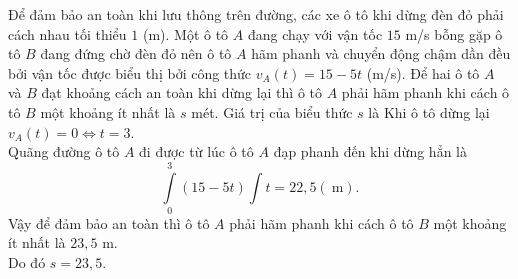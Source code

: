 \begin{bt}%
	Để đảm bảo an toàn khi lưu thông trên đường, các xe ô tô khi dừng đèn đỏ phải cách nhau tối thiểu $1$ (m). Một ô tô $A$ đang chạy với vận tốc $15$ m/s bỗng gặp ô tô $B$ đang đứng chờ đèn đỏ nên ô tô $A$ hãm phanh và chuyển động chậm dần đều bởi vận tốc được biểu thị bởi công thức $v_A(t)=15-5 t$ (m/s). Để hai ô tô $A$ và $B$ đạt khoảng cách an toàn khi dừng lại thì ô tô $A$ phải hãm phanh khi cách ô tô $B$ một khoảng ít nhất là $s$ mét. Giá trị của biểu thức $s$ là
	\loigiai
	{Khi ô tô dừng lại $v_A(t)=0 \Leftrightarrow t=3$.\\
		Quãng đường ô tô $A$ đi được từ lúc ô tô $A$ đạp phanh đến khi dừng hẳn là
		$$\displaystyle\int\limits_0^3(15-5 t)\displaystyle\int\limits t=22{,}5 (\mathrm{~m}).$$
		Vậy để đảm bảo an toàn thì ô tô $A$ phải hãm phanh khi cách ô tô $B$ một khoảng ít nhất là $23{,}5$ m.\\
		Do đó $s=23{,}5$.
	}
\end{bt}

